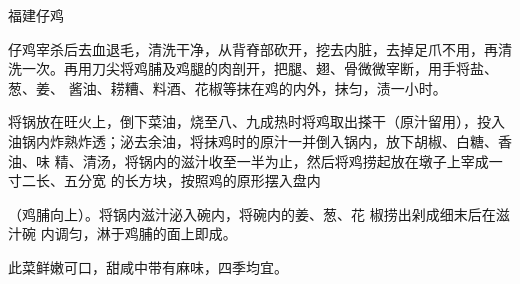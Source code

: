 \begin{recipe}{福建仔鸡}

\ingredients


\cooking

\step 仔鸡宰杀后去血退毛，清洗干净，从背脊部砍开，挖去内脏，去掉足爪不用，再清
洗一次。再用刀尖将鸡脯及鸡腿的肉剖开，把腿、翅、骨微微宰断，用手将盐、葱、姜、
酱油、耢糟、料酒、花椒等抹在鸡的内外，抹匀，渍一小时。

\step 将锅放在旺火上，倒下菜油，烧至八、九成热时将鸡取出搽干（原汁留用），投入
油锅内炸熟炸透；泌去余油，将抹鸡时的原汁一并倒入锅内，放下胡椒、白糖、香油、味
精、清汤，将锅内的滋汁收至一半为止，然后将鸡捞起放在墩子上宰成一寸二长、五分宽
的长方块，按照鸡的原形摆入盘内

（鸡脯向上）。将锅内滋汁泌入碗内，将碗内的姜、葱、花 椒捞出剁成细末后在滋汁碗
内调匀，淋于鸡脯的面上即成。

\features

此菜鲜嫩可口，甜咸中带有麻味，四季均宜。

\end{recipe}

